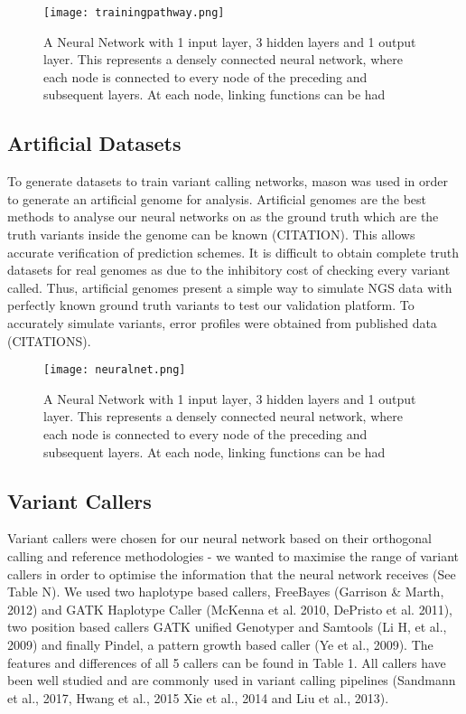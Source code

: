 \documentclass{article}
\begin{document}
\begin{figure}[h]
\texttt{[image: trainingpathway.png]}
\centering
\caption{A Neural Network with 1 input layer, 3 hidden layers and 1 output layer. This represents a densely connected neural network, where each node is connected to every node of the preceding and subsequent layers. At each node, linking functions can be had }
\end{figure}


\subsection{Artificial Datasets}
To generate datasets to train variant calling networks, mason was used in order to generate an artificial genome for analysis. Artificial genomes are the best methods to analyse our neural networks on as the ground truth which are the truth variants inside the genome can be known (CITATION). This allows accurate verification of prediction schemes. It is difficult to obtain complete truth datasets for real genomes as due to the inhibitory cost of checking every variant called. Thus, artificial genomes present a simple way to simulate NGS data with perfectly known ground truth variants to test our validation platform.
To accurately simulate variants, error profiles were obtained from published data (CITATIONS).

\begin{figure}[h]
\texttt{[image: neuralnet.png]}
\centering
\caption{A Neural Network with 1 input layer, 3 hidden layers and 1 output layer. This represents a densely connected neural network, where each node is connected to every node of the preceding and subsequent layers. At each node, linking functions can be had }
\end{figure}


\subsection{Variant Callers}
Variant callers were chosen for our neural network based on their orthogonal calling and reference methodologies - we wanted to maximise the range of variant callers in order to optimise the information that the neural network receives (See Table N). We used two haplotype based callers, FreeBayes (Garrison \& Marth, 2012) and GATK Haplotype Caller (McKenna et al. 2010, DePristo et al. 2011), two position based callers GATK unified Genotyper and Samtools (Li H, et al., 2009) and finally Pindel, a pattern growth based caller (Ye et al., 2009). The features and differences of all 5 callers can be found in Table 1.  All callers have been well studied and are commonly used in variant calling pipelines (Sandmann et al., 2017, Hwang et al., 2015 Xie et al., 2014 and Liu et al., 2013). 
\end{document}
